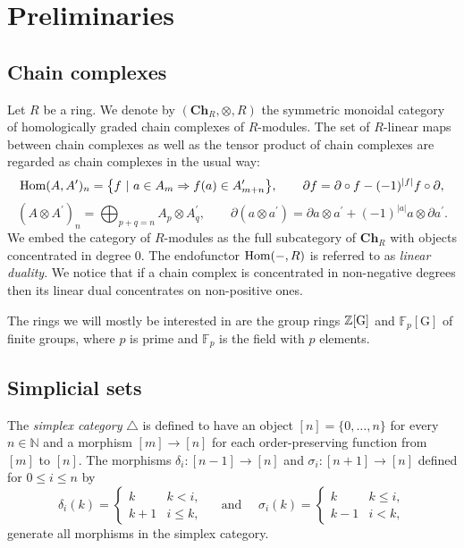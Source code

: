 
\section{Preliminaries} \label{s:preliminaries}

\subsection{Chain complexes} \label{s s:chain cpx}

Let $R$ be a ring.
We denote by $(\mathbf{Ch}_R, \otimes, R)$ the symmetric monoidal category of homologically graded chain complexes of $R$-modules.
The set of $R$-linear maps between chain complexes as well as the tensor product of chain complexes are regarded as chain complexes in the usual way:
\begin{equation*}
\mathrm{Hom}(A, A^\prime)_n = \big\{f \ |\ a \in A_m \Rightarrow f(a) \in A^\prime_{m+n} \big\}, \qquad
\partial f = \partial \circ f - (-1)^{|f|}f \circ \partial,
\end{equation*}
\begin{equation*}
(A \otimes A^\prime)_n = \bigoplus_{p + q = n} A_p \otimes A^\prime_q, \qquad \partial (a \otimes a^\prime) = \partial a \otimes a^\prime + (-1)^{|a|} a \otimes \partial a^\prime.
\end{equation*}
We embed the category of $R$-modules as the full subcategory of $\mathbf{Ch}_R$ with objects concentrated in degree $0$.
The endofunctor $\mathrm{Hom}(-, R)$ is referred to as \textit{linear duality}.
We notice that if a chain complex is concentrated in non-negative degrees then its linear dual concentrates on non-positive ones.

The rings we will mostly be interested in are the group rings $\mathbb{Z}[\mathrm G]$ and $\mathbb{F}_p[\mathrm G]$ of finite groups, where $p$ is prime and $\mathbb{F}_p$ is the field with $p$ elements.

\subsection{Simplicial sets}

The \textit{simplex category} $\triangle$ is defined to have an object $[n] = \{0, \dots, n\}$ for every $n \in \mathbb{N}$ and a morphism $[m] \to [n]$ for each order-preserving function from $[m]$ to $[n]$.
The morphisms $\delta_i \colon [n-1] \to [n]$ and $\sigma_i \colon [n+1] \to [n]$ defined for $0 \leq i \leq n$ by
\begin{equation*}
\delta_i(k) = 
\begin{cases} k & k < i, \\ k+1 & i \leq k, \end{cases}
\quad \text{ and } \quad
\sigma_i(k) = 
\begin{cases} k & k \leq i, \\ k-1 & i < k, \end{cases}
\end{equation*} 
generate all morphisms in the simplex category.

